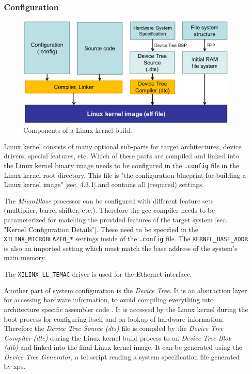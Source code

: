 \subsubsection{Configuration}

\begin{figure}
	\centering
	\includegraphics[width=.6\textwidth]{linux-config-build.png}
	\caption{Components of a Linux kernel build.}
\end{figure}

Linux kernel consists of many optional sub-parts for target architectures, device drivers, special features, etc. Which of these parts are compiled and linked into the Linux kernel binary image needs to be configured in the \texttt{.config} file in the Linux kernel root directory. This file is "the configuration blueprint for building a Linux kernel image" \cite{linuxPrimer}[sec. 4.3.1] and contains all (required) settings.

The \textit{MicroBlaze} processor can be configured with different feature sets (multiplier, barrel shifter, etc.). Therefore the \gls{gcc} compiler needs to be parameterized for matching the provided features of the target system \cite{mb_linux}[sec. "Kernel Configuration Details"]. These need to be specified in the \texttt{XILINX\_MICROBLAZE0\_*} settings inside of the \texttt{.config} file. The \texttt{KERNEL\_BASE\_ADDR} is also an imported setting which must match the base address of the system's main memory.

The \texttt{XILINX\_LL\_TEMAC} driver is used for the Ethernet interface.

Another part of system configuration is the \textit{Device Tree}. It is an abstraction layer for accessing hardware information, to avoid compiling everything into architecture specific assembler code \cite{device_tree}. It is accessed by the Linux kernel during the boot process for configuring itself and on lookup of hardware information. Therefore the \textit{Device Tree Source (dts)} file is compiled by the \textit{Device Tree Compiler (dtc)} during the Linux kernel build process to an \textit{Device Tree Blob (dtb)} and linked into the final Linux kernel image. It can be generated using the \textit{Device Tree Generator}, a \gls{tcl} script reading a system specification file generated by \gls{xps}.
\\

